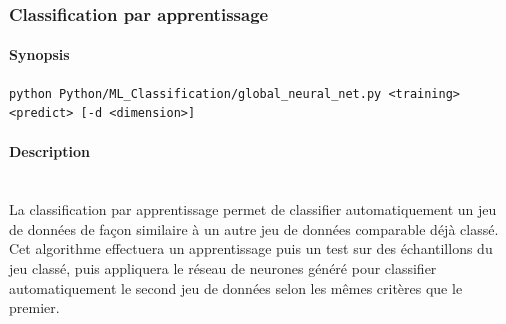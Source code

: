 \documentclass[a4paper]{report}
\begin{document}
\subsubsection{Classification par apprentissage}

\paragraph{Synopsis}

\begin{verbatim}
python Python/ML_Classification/global_neural_net.py <training> <predict> [-d <dimension>]
\end{verbatim}

\paragraph{Description}~\\

La classification par apprentissage permet de classifier automatiquement un jeu de données de façon similaire à un autre jeu de données comparable déjà classé. Cet algorithme effectuera un apprentissage puis un test sur des échantillons du jeu classé, puis appliquera le réseau de neurones généré pour classifier automatiquement le second jeu de données selon les mêmes critères que le premier.

\end{document}

